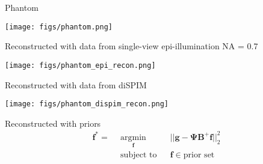 \documentclass[presentation]{beamer}
\begin{document}
\begin{frame}{Phantom}
\begin{center}
  \texttt{[image: figs/phantom.png]}
\end{center}
\end{frame}

\begin{frame}{Reconstructed with data from single-view epi-illumination NA = 0.7}
\begin{center}
  \texttt{[image: figs/phantom\_epi\_recon.png]}
\end{center}
\end{frame}

\begin{frame}{Reconstructed with data from diSPIM}
\begin{center}
  \texttt{[image: figs/phantom\_dispim\_recon.png]}
\end{center}
\end{frame}

\begin{frame}{Reconstructed with priors}
    \begin{equation*}
    \begin{aligned}
      \mathbf{f^*} =\ \  
    & \underset{\mathbf{f}}{\text{argmin}}
    & & ||\mathbf{g} - \mathbf{\Psi}\mathbf{B}^+\mathbf{f}||_2^2 \\
    & \text{subject to}
    & & \mathbf{f} \in \text{prior set}
    \end{aligned}
  \end{equation*}
\end{frame}

\end{document}
